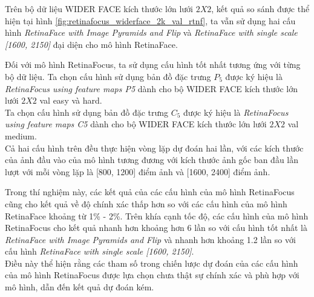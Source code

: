 {    \noindent
    Trên bộ dữ liệu WIDER FACE kích thước lớn lưới $2 X 2$, kết quả so sánh được thể hiện tại hình \ref{fig:retinafocus_widerface_2k_val_rtnf}, ta vẫn sử dụng hai cấu hình \textit{RetinaFace with Image Pyramids and Flip} và \textit{RetinaFace with single scale [1600, 2150]} đại diện cho mô hình RetinaFace.

    \noindent
    Đối với mô hình RetinaFocus, ta sử dụng cấu hình tốt nhất tương ứng với từng bộ dữ liệu.
    Ta chọn cấu hình sử dụng bản đồ đặc trưng $P_5$ được ký hiệu là \textit{RetinaFocus using feature maps P5} dành cho bộ WIDER FACE kích thước lớn lưới $2 X 2$ val easy và hard. \\
    Ta chọn cấu hình sử dụng bản đồ đặc trưng $C_5$ được ký hiệu là \textit{RetinaFocus using feature maps C5} dành cho bộ WIDER FACE kích thước lớn lưới $2 X 2$ val medium. \\
    Cả hai cấu hình trên đều thực hiện vòng lặp dự đoán hai lần, với các kích thước của ảnh đầu vào của mô hình tương đương với kích thước ảnh gốc ban đầu lần lượt với mỗi vòng lặp là [800, 1200] điểm ảnh và [1600, 2400] điểm ảnh.

    \noindent
    Trong thí nghiệm này, các kết quả của các cấu hình của mô hình RetinaFocus cũng cho kết quả về độ chính xác thấp hơn so với các cấu hình của mô hình RetinaFace khoảng từ 1\% - 2\%.
    Trên khía cạnh tốc độ, các cấu hình của mô hình RetinaFocus cho kết quả nhanh hơn khoảng hơn 6 lần so với cấu hình tốt nhất là \textit{RetinaFace with Image Pyramids and Flip} và nhanh hơn khoảng 1.2 lần so với cấu hình \textit{RetinaFace with single scale [1600, 2150]}. \\
    Điều này thể hiện rằng các tham số trong chiến lược dự đoán của các cấu hình của mô hình RetinaFocus được lựa chọn chưa thật sự chính xác và phù hợp với mô hình, dẫn đến kết quả dự đoán kém.

}
